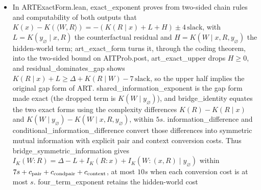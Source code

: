 \documentclass[11pt,a4paper]{article}
\newcommand{\lean}[1]{{\ttfamily\small
  \let\leanunderscore\_\def\_{\leanunderscore\allowbreak}#1}}
\begin{document}
\begin{itemize}[leftmargin=1.4em,itemsep=1pt]
between pairs. \lean{independent\_regulation\_threshold} needs a uniform allowance
only on the event $\{\Delta\ge d,L\le\ell\}$.
\lean{independent\_gart\_probability} derives its pointwise premise from
\lean{grounded\_inequality}, with allowance $4\,\mathrm{slack}$.
\lean{independent\_regulation\_given\_residual} conditions on a positive-mass
residual-budget event and retains its probability in the denominator. This
selection can remove the exponential rarity of the unconditioned joint event.
These are prospective bounds under independently sampled initial descriptions, separate
from ART's joint-prior posterior. Computability-to-coding domination and prefix Kraft
remain named classical AIT inputs; the exponential moment and regulation consequences
are proved from them.
\lean{threshold\_from\_local\_gart} requires GART only on the
positive-weight support where $L\le\eta$.
\lean{given\_residual\_from\_local\_gart} divides the resulting joint-event
bound by $q_\eta=\Pr(L\le\eta)>0$ and caps it at one.
\lean{product\_event\_mass\_le\_one} derives the finite event mass from
normalized marginals; finiteness is not an independent probability
assumption in that application.
\item In \lean{ARTExactForm.lean}, \lean{exact\_exponent} proves from two-sided chain rules and
computability of both outputs that $K(x)-K(\langle W,R\rangle)=-(K(R\mid x)+L+H)\pm4\,\mathrm{slack}$,
with $L=K(y_\varnothing\mid x,R)$ the counterfactual residual and $H=K(W\mid x,R,y_\varnothing)$ the
hidden-world term; \lean{art\_exact\_form} turns it, through the coding theorem, into the
two-sided bound on \lean{AITProb.post}, \lean{art\_exact\_upper} drops $H\ge0$, and
\lean{residual\_dominates\_gap} shows $K(R\mid x)+L\ge\Delta+K(R\mid W)-7\,\mathrm{slack}$,
so the upper half implies the original gap form of ART. \lean{shared\_information\_exponent}
is the gap form made exact (the dropped term is $K(W\mid y_\varnothing)$), and
\lean{bridge\_identity} equates the two exact forms using the complexity
differences $K(R)-K(R\mid x)$ and
$K(W\mid y_\varnothing)-K(W\mid x,R,y_\varnothing)$, within $5s$.
\lean{information\_difference} and
\lean{conditional\_information\_difference} convert those differences
into symmetric mutual information with explicit pair and context
conversion costs. Thus \lean{bridge\_symmetric\_information} gives
$I_K(W{:}R)=\Delta-L+I_K(R{:}x)+I_K(W{:}(x,R)\mid y_\varnothing)$
within $7s+c_{\rm pair}+c_{\rm condpair}+c_{\rm context}$, at most $10s$
when each conversion cost is at most $s$.
\lean{four\_term\_exponent} retains the hidden-world cost

\end{itemize}
\end{document}
